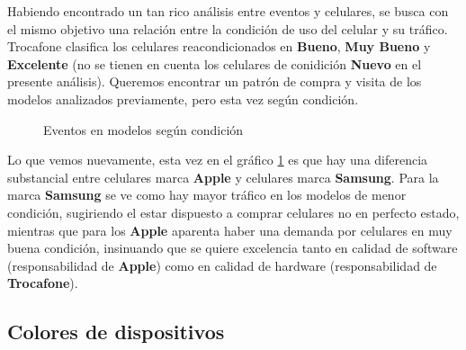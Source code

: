 \documentclass[a4paper]{article}
\begin{document}
Habiendo encontrado un tan rico análisis entre eventos y celulares, se busca con el mismo objetivo una relación entre la condición de uso del celular y su tráfico. Trocafone clasifica los celulares reacondicionados en \textbf{Bueno}, \textbf{Muy Bueno} y \textbf{Excelente} (no se tienen en cuenta los celulares de conidición \textbf{Nuevo} en el presente análisis). Queremos encontrar un patrón de compra y visita de los modelos analizados previamente, pero esta vez según condición.

\begin{figure}[h!]
	\caption{Eventos en modelos según condición}
	\label{fig:prominentescondicion}
\end{figure}

Lo que vemos nuevamente, esta vez en el gráfico \ref{fig:prominentescondicion} es que hay una diferencia substancial entre celulares marca \textbf{Apple} y celulares marca \textbf{Samsung}. Para la marca \textbf{Samsung} se ve como hay mayor tráfico en los modelos de menor condición, sugiriendo el estar dispuesto a comprar celulares no en perfecto estado, mientras que para los \textbf{Apple} aparenta haber una demanda por celulares en muy buena condición, insinuando que se quiere excelencia tanto en calidad de software (responsabilidad de \textbf{Apple}) como en calidad de hardware (responsabilidad de \textbf{Trocafone}).

\subsection{Colores de dispositivos}
\end{document}
